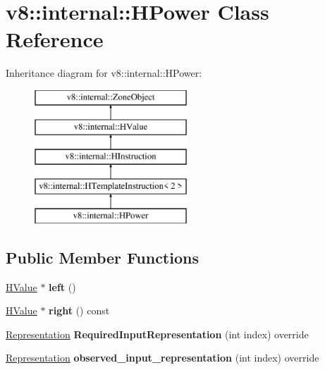 \hypertarget{classv8_1_1internal_1_1_h_power}{}\section{v8\+:\+:internal\+:\+:H\+Power Class Reference}
\label{classv8_1_1internal_1_1_h_power}
Inheritance diagram for v8\+:\+:internal\+:\+:H\+Power\+:\begin{figure}[H]
\begin{center}
\leavevmode
\includegraphics[height=5.000000cm]{classv8_1_1internal_1_1_h_power}
\end{center}
\end{figure}
\subsection*{Public Member Functions}
\begin{DoxyCompactItemize}
\item 
\hyperlink{classv8_1_1internal_1_1_h_value}{H\+Value} $\ast$ {\bfseries left} ()\hypertarget{classv8_1_1internal_1_1_h_power_ac619b8b6f5c5a3b60eba0d0b921790b8}{}\label{classv8_1_1internal_1_1_h_power_ac619b8b6f5c5a3b60eba0d0b921790b8}

\item 
\hyperlink{classv8_1_1internal_1_1_h_value}{H\+Value} $\ast$ {\bfseries right} () const \hypertarget{classv8_1_1internal_1_1_h_power_afa38ea21df9bfeb53601b2237df5818d}{}\label{classv8_1_1internal_1_1_h_power_afa38ea21df9bfeb53601b2237df5818d}

\item 
\hyperlink{classv8_1_1internal_1_1_representation}{Representation} {\bfseries Required\+Input\+Representation} (int index) override\hypertarget{classv8_1_1internal_1_1_h_power_a6f0bfcb4997d3c495474f96f162e6536}{}\label{classv8_1_1internal_1_1_h_power_a6f0bfcb4997d3c495474f96f162e6536}

\item 
\hyperlink{classv8_1_1internal_1_1_representation}{Representation} {\bfseries observed\+\_\+input\+\_\+representation} (int index) override\hypertarget{classv8_1_1internal_1_1_h_power_aa37371db1fc1ba3696698dc6c3e2ec05}{}\label{classv8_1_1internal_1_1_h_power_aa37371db1fc1ba3696698dc6c3e2ec05}

\end{DoxyCompactItemize}
